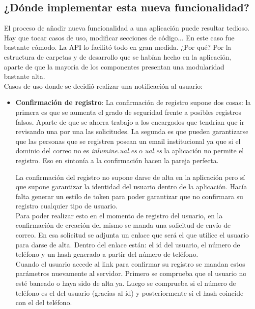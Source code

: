 \subsection{¿Dónde implementar esta nueva funcionalidad?}
El proceso de añadir nueva funcionalidad a una aplicación puede resultar tedioso. Hay que tocar casos de uso, modificar secciones de código... En este caso fue bastante cómodo. La API lo facilitó todo en gran medida. ¿Por qué? Por la estructura de carpetas y de desarrollo que se habían hecho en la aplicación, aparte de que la mayoría de los componentes presentan una modularidad bastante alta.
\\Casos de uso donde se decidió realizar una notificación al usuario:
\begin{itemize}
    \item \textbf{Confirmación de registro}: La confirmación de registro supone dos cosas: la primera es que se aumenta el grado de seguridad frente a posibles registros falsos. Aparte de que se ahorra trabajo a los encargados que tendrían que ir revisando una por una las solicitudes. La segunda es que pueden garantizarse que las personas que se registren posean un email institucional ya que si el dominio del correo no es \textit{inlumine.ual.es} o \textit{ual.es} la aplicación no permite el registro. Eso en sintonía a la confirmación hacen la pareja perfecta.
          \begin{tcolorbox}
              [colback=green!5!white,colframe=green!75!black,fonttitle=\bfseries,title=¿Cómo se puede realizar la confirmación del registro?]
              La confirmación del registro no supone darse de alta en la aplicación pero sí que supone garantizar la identidad del usuario dentro de la aplicación. Hacía falta generar un estilo de token para poder garantizar que no confirmara su registro cualquier tipo de usuario.
              \\Para poder realizar esto en el momento de registro del usuario, en la confirmación de creación del mismo se manda una solicitud de envío de correo. En esa solicitud se adjunta un enlace que será el que utilice el usuario para darse de alta. Dentro del enlace están: el id del usuario, el número de teléfono y un hash generado a partir del número de teléfono.
              \\Cuando el usuario accede al link para confirmar su registro se mandan estos parámetros nuevamente al servidor. Primero se comprueba que el usuario no esté baneado o haya sido de alta ya. Luego se comprueba si el número de teléfono es el del usuario (gracias al id) y posteriormente si el hash coincide con el del teléfono.

\end{tcolorbox}
\end{itemize}
